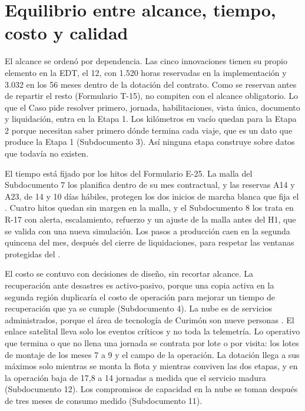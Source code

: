 \section{Equilibrio entre alcance, tiempo, costo y calidad}\label{sec:14-equilibrio-entre-alcance-tiempo-}

El alcance se ordenó por dependencia. Las cinco innovaciones tienen su propio elemento en la EDT, el 12,
con 1.520 horas reservadas en la implementación y 3.032 en los 56 meses dentro de la dotación del
contrato. Como se reservan antes de repartir el resto (Formulario T-15), no compiten con el alcance
obligatorio. Lo que el Caso pide resolver primero, jornada, habilitaciones,
vista única, documento y liquidación, entra en la Etapa 1. Los kilómetros en vacío quedan para la Etapa 2
porque necesitan saber primero dónde termina cada viaje, que es un dato que produce la Etapa 1
(Subdocumento 3). Así ninguna etapa construye sobre datos que todavía no existen.

El tiempo está fijado por los hitos del Formulario E-25. La malla del Subdocumento 7 los planifica
dentro de su mes contractual, y las reservas A14 y A23, de 14 y 10 días hábiles, protegen los dos
inicios de marcha blanca que fija el . Cuatro hitos quedan sin margen en la malla, y el
Subdocumento 8 los trata en R-17 con alerta, escalamiento, refuerzo y un ajuste de la malla antes del
H1, que se valida con una nueva simulación. Los pasos a producción caen en la segunda quincena del mes,
después del cierre de liquidaciones, para respetar las ventanas protegidas del .

El costo se contuvo con decisiones de diseño, sin recortar alcance. La recuperación ante desastres es
activo-pasivo, porque una copia activa en la segunda región duplicaría el costo de operación para
mejorar un tiempo de recuperación que ya se cumple (Subdocumento 4). La nube es de servicios
administrados, porque el área de tecnología de Curimón son nueve personas . El enlace satelital lleva
solo los eventos críticos y no toda la telemetría. Lo operativo que termina o que no llena una jornada
se contrata por lote o por visita: los lotes de montaje de los meses 7 a 9 y el campo de la operación.
La dotación llega a sus máximos solo mientras se monta la flota y mientras conviven las dos etapas, y
en la operación baja de 17,8 a 14 jornadas a medida que el servicio madura (Subdocumento 12). Los compromisos de
capacidad en la nube se toman después de tres meses de consumo medido (Subdocumento 11).

